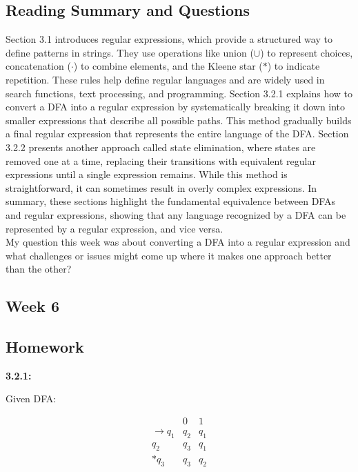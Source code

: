 \documentclass{article}
\theoremstyle{theorem}
\theoremstyle{definition}
\theoremstyle{remark}
\begin{document}
\subsection*{Reading Summary and Questions}

Section 3.1 introduces regular expressions, which provide a structured way to define patterns in strings. They use operations like union (\(\cup\)) to represent choices, 
concatenation (\(\cdot\)) to combine elements, and the Kleene star (\(*\)) to indicate repetition. These rules help define regular languages and are widely 
used in search functions, text processing, and programming. Section 3.2.1 explains how to convert a DFA into a regular expression by systematically breaking it down into smaller 
expressions that describe all possible paths. This method gradually builds a final regular expression that represents the entire language of the DFA. Section 3.2.2 presents another 
approach called state elimination, where states are removed one at a time, replacing their transitions with equivalent regular expressions until a single expression remains. 
While this method is straightforward, it can sometimes result in overly complex expressions. In summary, these sections highlight the fundamental equivalence between DFAs and regular expressions, 
showing that any language recognized by a DFA can be represented by a regular expression, and vice versa. \\

My question this week was about converting a DFA into a regular expression and what challenges or issues might come up where it makes one approach better than the other?

\bigskip


\subsection{Week 6}
\smallskip

\subsection*{Homework}
\textbf{3.2.1:}

Given DFA:

\[
\begin{array}{c|cc}
 & 0 & 1 \\
\hline
\rightarrow q_1 & q_2 & q_1 \\
q_2 & q_3 & q_1 \\
\ast q_3 & q_3 & q_2 \\
\end{array}
\]
\end{document}
